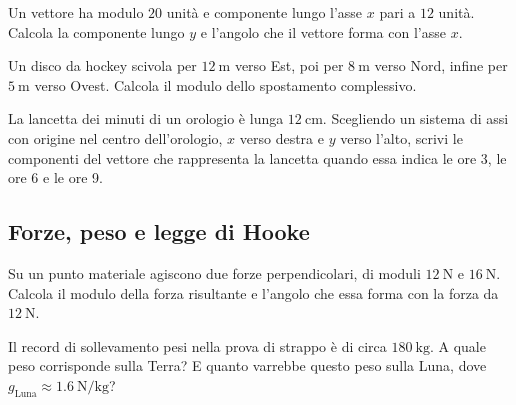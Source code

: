 \begin{esercizio}
Un vettore ha modulo $20$ unità e componente lungo l'asse $x$ pari a $12$ unità. Calcola la componente lungo $y$ e l'angolo che il vettore forma con l'asse $x$.\\
\end{esercizio}

\begin{esercizio}
Un disco da hockey scivola per $\SI{12}{\meter}$ verso Est, poi per $\SI{8}{\meter}$ verso Nord, infine per $\SI{5}{\meter}$ verso Ovest. Calcola il modulo dello spostamento complessivo.\\
\end{esercizio}

\begin{esercizio}
La lancetta dei minuti di un orologio è lunga $\SI{12}{\centi\meter}$. Scegliendo un sistema di assi con origine nel centro dell'orologio, $x$ verso destra e $y$ verso l'alto, scrivi le componenti del vettore che rappresenta la lancetta quando essa indica le ore 3, le ore 6 e le ore 9.\\
\end{esercizio}

\subsection*{Forze, peso e legge di Hooke}

\begin{esercizio}
Su un punto materiale agiscono due forze perpendicolari, di moduli $\SI{12}{\newton}$ e $\SI{16}{\newton}$. Calcola il modulo della forza risultante e l'angolo che essa forma con la forza da $\SI{12}{\newton}$.\\
\end{esercizio}

\begin{esercizio}
Il record di sollevamento pesi nella prova di strappo è di circa $\SI{180}{\kilo\gram}$. A quale peso corrisponde sulla Terra? E quanto varrebbe questo peso sulla Luna, dove $g_{\text{Luna}} \approx \SI{1,6}{\newton\per\kilo\gram}$?\\
\end{esercizio}

